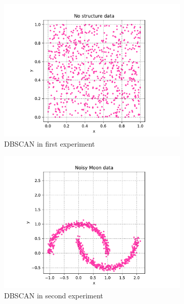 \begin{figure}[h]
	\begin{subfigure}{0.33\linewidth}
		\centering
		\includegraphics[width=\linewidth]{figures/1-NoStructure}  
		\caption{DBSCAN in first experiment}
		\label{fig:p1-1}
	\end{subfigure}
	\begin{subfigure}{0.33\textwidth}
		\centering
		\includegraphics[width=\linewidth]{figures/2-NoisyMoon}
		\caption{DBSCAN in second experiment}
		\label{fig:p1-2}
	\end{subfigure}
	\begin{subfigure}{0.33\textwidth}
		\centering

\end{subfigure}
\end{figure}
